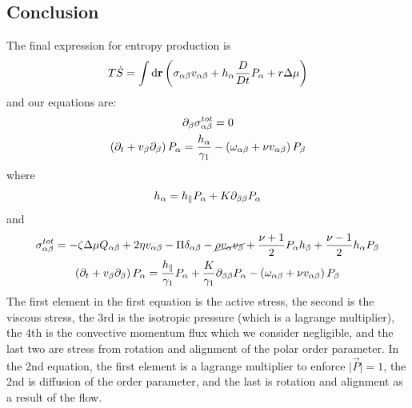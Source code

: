 \subsection{Conclusion}
The final expression for entropy production is
\begin{equation}
    T\dot{S} = \int \mathop{}\!\mathrm{d}\mathbf{r} \left(\sigma_{\alpha\beta} v_{\alpha\beta} + h_\alpha \frac{D}{Dt}P_\alpha + r\Delta\mu\right)
\end{equation}
and our equations are:
\begin{gather}
    \partial_\beta\sigma_{\alpha\beta}^{tot} = 0 \\
    \left(\partial_t + v_\beta\partial_\beta\right) P_\alpha = \frac{h_\alpha}{\gamma_1} - \left(\omega_{\alpha\beta}+\nu v_{\alpha\beta}\right) P_\beta
\end{gather}
where
\begin{equation}
    h_\alpha = h_{\parallel}P_\alpha + K\partial_{\beta\beta}P_\alpha
\end{equation}
and
\begin{gather}
    \sigma_{\alpha\beta}^{tot} = -\zeta\Delta\mu Q_{\alpha\beta} + 2\eta v_{\alpha\beta} - \Pi \delta_{\alpha\beta} - \cancel{\rho v_\alpha v_\beta} + \frac{\nu+1}{2} P_\alpha h_\beta + \frac{\nu-1}{2} h_\alpha P_\beta \\
    \left(\partial_t+v_\beta\partial_\beta\right)P_\alpha = \frac{h_{\parallel}}{\gamma_1}P_\alpha + \frac{K}{\gamma_1}\partial_{\beta\beta}P_\alpha - \left(\omega_{\alpha\beta}+\nu v_{\alpha\beta}\right)P_\beta
\end{gather}
The first element in the first equation is the active stress, the second is the viscous stress, the 3rd is the isotropic pressure (which is a lagrange multiplier), the 4th is the convective momentum flux which we consider negligible, and the last two are stress from rotation and alignment of the polar order parameter. In the 2nd equation, the first element is a lagrange multiplier to enforce \(\vert \vec{P}\vert = 1\), the 2nd is diffusion of the order parameter, and the last is rotation and alignment as a result of the flow.

